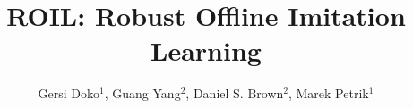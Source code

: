 \documentclass[final,a0paper]{beamer}
\title{ROIL\@: Robust Offline Imitation Learning}
\author[]{Gersi Doko$^{1}$, Guang Yang$^{2}$, Daniel S. Brown$^{2}$, Marek Petrik$^{1}$}
\institute{$^{1}$University of New Hampshire, $^{2}$University of Utah}
\begin{document}
\begin{frame}{}
\vspace{-2cm}
\begin{columns}[t]
  \begin{column}{0.3\linewidth}
    
    
    
  \end{column}
  
  \begin{column}{0.3\linewidth}
    
    
  \end{column}

  \begin{column}{0.3\linewidth}
    
  \end{column}
\end{columns}
\end{frame}
\end{document}
